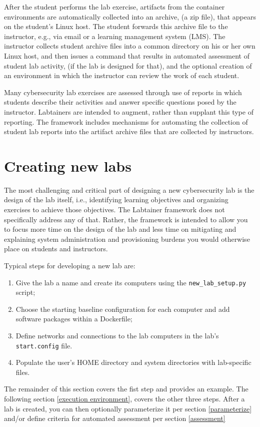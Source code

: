 \documentclass[12pt]{article}
\begin{document}
After the student performs the lab exercise, artifacts from the container
environments are automatically collected into an archive, (a zip file), that appears on
the student's Linux host.  The student forwards this archive file to the instructor,
e.g., via email or a learning management system (LMS).  The instructor collects student archive files into a common
directory on his or her own Linux host, and then issues a command that
results in automated assessment of student lab
activity, (if the lab is designed for that), and the optional creation of an environment
in which the instructor can review the work of each student.

Many cybersecurity lab exercises are assessed through use of reports in which students
describe their activities and answer specific questions posed by the instructor.  Labtainers
are intended to augment, rather than supplant this type of reporting.  The framework includes
mechanisms for automating the collection of student lab reports into the artifact archive files
that are collected by instructors. 


\section {Creating new labs}
\label{sec:new_labs}
The most challenging and critical part of designing a new cybersecurity lab
is the design of the lab itself, i.e., identifying learning objectives and
organizing exercises to achieve those objectives.  The Labtainer framework
does not specifically address any of that.  Rather, the framework is intended
to allow you to focus more time on the design of the lab and less time on mitigating and
explaining system administration and provisioning burdens you would otherwise place on 
students and instructors.

Typical steps for developing a new lab are:
\begin{enumerate}
\item Give the lab a name and create its computers using the {\tt new\_lab\_setup.py} script;
\item Choose the starting baseline configuration for each computer and add software packages
within a Dockerfile;
\item Define networks and connections to the lab computers in the lab's {\tt start.config} file.
\item Populate the user's HOME directory and system directories with lab-specific files.
\end{enumerate}
The remainder of this section covers the fist step and provides an example.  The 
following section \ref{execution environment}, covers the other three
steps.  After a lab is created, you can then optionally parameterize it per section \ref{parameterize} and/or
define criteria for automated assessment per section \ref{assessment}
\end{document}
